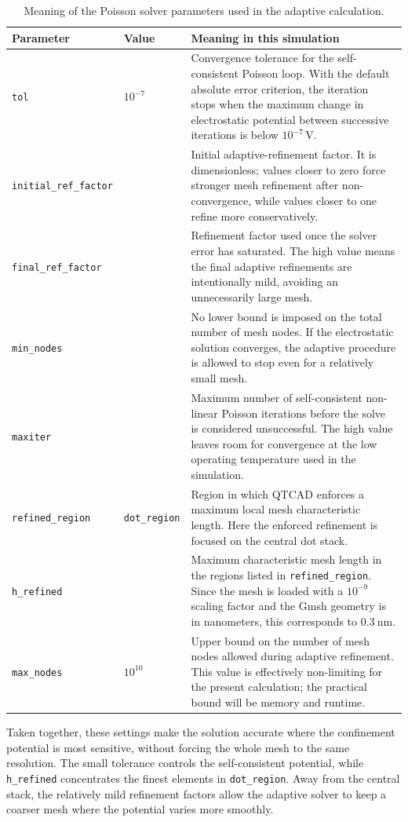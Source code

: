 \begin{table}[H]
\centering
\begin{tabular}{|>{\raggedright\arraybackslash}p{3.2cm}|>{\raggedright\arraybackslash}p{2.2cm}|>{\raggedright\arraybackslash}p{8.5cm}|}
\hline
Parameter & Value & Meaning in this simulation \\
\hline
\texttt{tol} & \(10^{-7}\) & Convergence tolerance for the self-consistent Poisson loop. With the default absolute error criterion, the iteration stops when the maximum change in electrostatic potential between successive iterations is below \(10^{-7}\,\mathrm{V}\). \\
\hline
\texttt{initial\_ref\_factor} & 0.55 & Initial adaptive-refinement factor. It is dimensionless; values closer to zero force stronger mesh refinement after non-convergence, while values closer to one refine more conservatively. \\
\hline
\texttt{final\_ref\_factor} & 0.85 & Refinement factor used once the solver error has saturated. The high value means the final adaptive refinements are intentionally mild, avoiding an unnecessarily large mesh. \\
\hline
\texttt{min\_nodes} & 0 & No lower bound is imposed on the total number of mesh nodes. If the electrostatic solution converges, the adaptive procedure is allowed to stop even for a relatively small mesh. \\
\hline
\texttt{maxiter} & 1000 & Maximum number of self-consistent non-linear Poisson iterations before the solve is considered unsuccessful. The high value leaves room for convergence at the low operating temperature used in the simulation. \\
\hline
\texttt{refined\_region} & \texttt{dot\_region} & Region in which QTCAD enforces a maximum local mesh characteristic length. Here the enforced refinement is focused on the central dot stack. \\
\hline
\texttt{h\_refined} & 0.3 & Maximum characteristic mesh length in the regions listed in \texttt{refined\_region}. Since the mesh is loaded with a \(10^{-9}\) scaling factor and the Gmsh geometry is in nanometers, this corresponds to \(\SI{0.3}{\nano\meter}\). \\
\hline
\texttt{max\_nodes} & \(10^{10}\) & Upper bound on the number of mesh nodes allowed during adaptive refinement. This value is effectively non-limiting for the present calculation; the practical bound will be memory and runtime. \\
\hline
\end{tabular}
\caption{Meaning of the Poisson solver parameters used in the adaptive calculation.}
\label{tab:poisson_params}
\end{table}

Taken together, these settings make the solution accurate where the confinement
potential is most sensitive, without forcing the whole mesh to the same
resolution. The small tolerance controls the self-consistent potential, while
\texttt{h\_refined} concentrates the finest elements in \texttt{dot\_region}.
Away from the central stack, the relatively mild refinement factors allow the
adaptive solver to keep a coarser mesh where the potential varies more smoothly.
